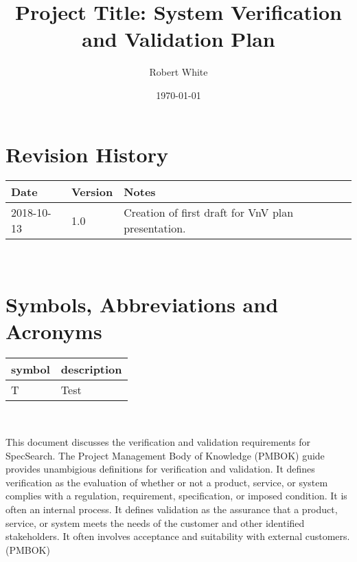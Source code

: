 \documentclass[12pt, titlepage]{article}
\begin{document}
\title{Project Title: System Verification and Validation Plan} 
\author{Robert White}
\date{\today}
	
\maketitle


\section{Revision History}

\begin{tabularx}{\textwidth}{p{3cm}p{2cm}X}
\toprule {\bf Date} & {\bf Version} & {\bf Notes}\\
\midrule
2018-10-13 & 1.0 & Creation of first draft for VnV plan presentation.\\
\bottomrule
\end{tabularx}

~\newpage

\section{Symbols, Abbreviations and Acronyms}

\renewcommand{\arraystretch}{1.2}
\begin{tabular}{l l} 
  \toprule		
  \textbf{symbol} & \textbf{description}\\
  \midrule 
  T & Test\\
  \bottomrule
\end{tabular}\\


\newpage

\tableofcontents

\listoftables

\listoffigures

\newpage


This document discusses the verification and validation requirements for 
SpecSearch. The Project Management Body of Knowledge (PMBOK) guide provides 
unambigious definitions for verification and validation. It defines 
verification as the evaluation of whether or not a product, service, or system 
complies with a regulation, requirement, specification, or imposed condition. 
It is often an internal process. It defines validation as the assurance that a 
product, service, or system meets the needs of the customer and other 
identified stakeholders. It often involves acceptance and suitability with 
external customers. (PMBOK)
\end{document}
